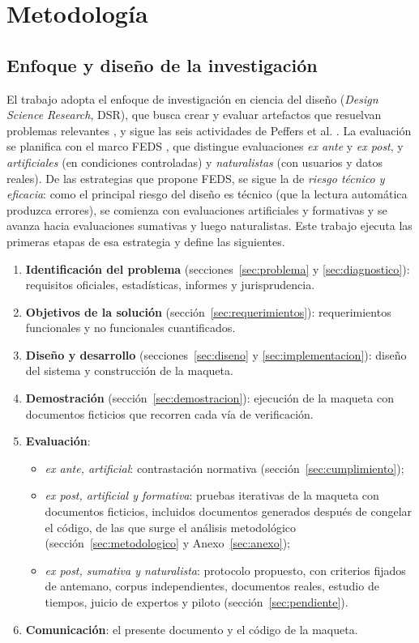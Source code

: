 \documentclass[11pt,a4paper]{article}
\begin{document}
\section{Metodología}
\label{sec:metodologia}

\subsection{Enfoque y diseño de la investigación}
El trabajo adopta el enfoque de investigación en ciencia del diseño (\emph{Design Science Research}, DSR), que busca crear y evaluar artefactos que resuelvan problemas relevantes \cite{hevner2004}, y sigue las seis actividades de Peffers et al. \cite{peffers2007}. La evaluación se planifica con el marco FEDS \cite{venable2016}, que distingue evaluaciones \emph{ex ante} y \emph{ex post}, y \emph{artificiales} (en condiciones controladas) y \emph{naturalistas} (con usuarios y datos reales). De las estrategias que propone FEDS, se sigue la de \emph{riesgo técnico y eficacia}: como el principal riesgo del diseño es técnico (que la lectura automática produzca errores), se comienza con evaluaciones artificiales y formativas y se avanza hacia evaluaciones sumativas y luego naturalistas. Este trabajo ejecuta las primeras etapas de esa estrategia y define las siguientes.

\begin{enumerate}
  \item \textbf{Identificación del problema} (secciones~\ref{sec:problema} y \ref{sec:diagnostico}): requisitos oficiales, estadísticas, informes y jurisprudencia.
  \item \textbf{Objetivos de la solución} (sección~\ref{sec:requerimientos}): requerimientos funcionales y no funcionales cuantificados.
  \item \textbf{Diseño y desarrollo} (secciones~\ref{sec:diseno} y \ref{sec:implementacion}): diseño del sistema y construcción de la maqueta.
  \item \textbf{Demostración} (sección~\ref{sec:demostracion}): ejecución de la maqueta con documentos ficticios que recorren cada vía de verificación.
  \item \textbf{Evaluación}:
  \begin{itemize}
    \item \emph{ex ante, artificial}: contrastación normativa (sección~\ref{sec:cumplimiento});
    \item \emph{ex post, artificial y formativa}: pruebas iterativas de la maqueta con documentos ficticios, incluidos documentos generados después de congelar el código, de las que surge el análisis metodológico (sección~\ref{sec:metodologico} y Anexo~\ref{sec:anexo});
    \item \emph{ex post, sumativa y naturalista}: protocolo propuesto, con criterios fijados de antemano, corpus independientes, documentos reales, estudio de tiempos, juicio de expertos y piloto (sección~\ref{sec:pendiente}).
  \end{itemize}
  \item \textbf{Comunicación}: el presente documento y el código de la maqueta.
\end{enumerate}
\end{document}
